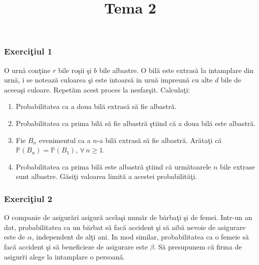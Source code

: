 \documentclass[]{article}
\title{Tema 2}
\author{}
\date{}
\def\a{{\alpha}}
\def\b{{\beta}}
\def\PP{{\mathbb P}}
\begin{document}
\maketitle

\thispagestyle{fancy}

\subsubsection{\texorpdfstring{Exerci\c tiul
1}{Exerciiul 1}}\label{exerciiul-1}

O urn\u a con\c tine \(r\) bile ro\c sii \c si \(b\) bile albastre. O
bil\u a este extras\u a la intamplare din urn\u a, i se noteaz\u a
culoarea \c si este intoars\u a in urn\u a impreun\u a cu alte \(d\)
bile de aceea\c si culoare. Repet\u am acest proces la nesfar\c sit.
Calcula\c ti:

\begin{enumerate}
\def\labelenumi{\alph{enumi})}
\item
  Probabilitatea ca a doua bil\u a extras\u a s\u a fie albastr\u a.
\item
  Probabilitatea ca prima bil\u a s\u a fie albastr\u a \c stiind c\u a
  a doua bil\u a este albastr\u a.
\item
  Fie \(B_n\) evenimentul ca a \(n\)-a bil\u a extras\u a s\u a fie
  albastr\u a. Ar\u ata\c ti c\u a \(\PP(B_n)=\PP(B_1)\),
  \(\forall\, n\geq1\).
\item
  Probabilitatea ca prima bil\u a este albastr\u a \c stiind c\u a
  urm\u atoarele \(n\) bile extrase sunt albastre. G\u asi\c ti valoarea
  limit\u a a acestei probabilit\u a\c ti.
\end{enumerate}

\subsubsection{\texorpdfstring{Exerci\c tiul
2}{Exerciiul 2}}\label{exerciiul-2}

O companie de asigur\u ari asigur\u a acela\c si num\u ar de
b\u arba\c ti \c si de femei. Intr-un an dat, probabilitatea ca un
b\u arbat s\u a fac\u a accident \c si s\u a aib\u a nevoie de asigurare
este de \(\a\), independent de al\c ti ani. In mod similar,
probabilitatea ca o femeie s\u a fac\u a accident \c si s\u a
beneficieze de asigurare este \(\b\). S\u a presupunem c\u a firma de
asigur\u ri alege la intamplare o persoan\u a.
\end{document}
